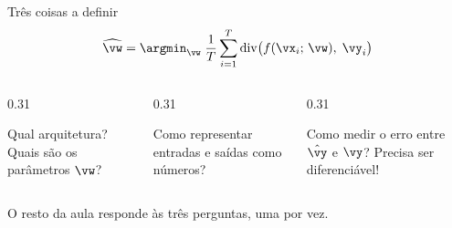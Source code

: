 \documentclass[aspectratio=169, 11pt]{beamer}
\begin{document}
\begin{frame}{Três coisas a definir}
  \[
    \widehat{\vw} = \argmin_{\vw}\; \frac{1}{T} \sum_{i=1}^{T}
      \mathrm{div}\big( f(\vx_i;\, \vw),\; \vy_i \big)
  \]

  \begin{columns}[T]
    \begin{column}{0.31\textwidth}
      \begin{tcolorbox}[iccaixa=icAzul, title={A rede $f(\cdot\,; \vw)$}]
        \small Qual arquitetura? Quais são os parâmetros $\vw$?
      \end{tcolorbox}
    \end{column}
    \begin{column}{0.31\textwidth}
      \begin{tcolorbox}[iccaixa=icCiano, title={Os pares $(\vx_i, \vy_i)$}]
        \small Como representar entradas e saídas como números?
      \end{tcolorbox}
    \end{column}
    \begin{column}{0.31\textwidth}
      \begin{tcolorbox}[iccaixa=icMagenta, title={A divergência}]
        \small Como medir o erro entre $\hat{\vy}$ e $\vy$? Precisa ser diferenciável!
      \end{tcolorbox}
    \end{column}
  \end{columns}

  \medskip
  O resto da aula responde às três perguntas, uma por vez.
\end{frame}
\end{document}
